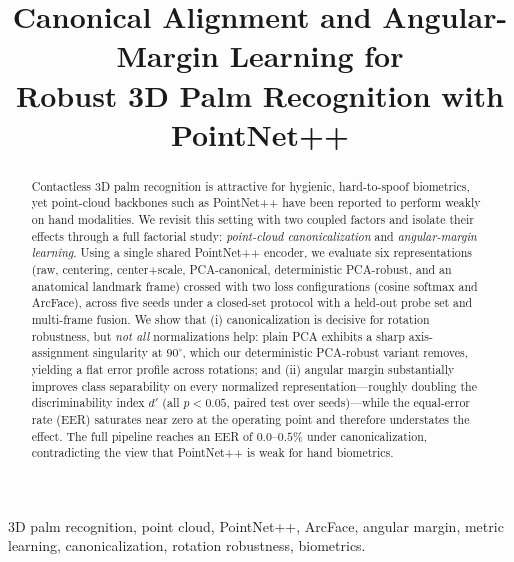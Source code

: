\documentclass[conference]{IEEEtran}
\begin{document}
\title{Canonical Alignment and Angular-Margin Learning for\\
Robust 3D Palm Recognition with PointNet++}

\author{
}

\maketitle

\begin{abstract}
Contactless 3D palm recognition is attractive for hygienic, hard-to-spoof
biometrics, yet point-cloud backbones such as PointNet++ have been reported to
perform weakly on hand modalities. We revisit this setting with two coupled
factors and isolate their effects through a full factorial study:
\emph{point-cloud canonicalization} and \emph{angular-margin learning}. Using a
single shared PointNet++ encoder, we evaluate six representations
(raw, centering, center+scale, PCA-canonical, deterministic PCA-robust, and an
anatomical landmark frame) crossed with two loss configurations (cosine softmax
and ArcFace), across five seeds under a closed-set protocol with a held-out probe
set and multi-frame fusion. We show that (i) canonicalization is decisive for
rotation robustness, but \emph{not all} normalizations help: plain PCA exhibits a
sharp axis-assignment singularity at $90^{\circ}$, which our deterministic
PCA-robust variant removes, yielding a flat error profile across rotations; and
(ii) angular margin substantially improves class separability on every
normalized representation---roughly doubling the discriminability index
$d'$ (all $p<0.05$, paired test over seeds)---while the equal-error rate (EER)
saturates near zero at the operating point and therefore understates the effect.
The full pipeline reaches an EER of $0.0$--$0.5\%$ under canonicalization,
contradicting the view that PointNet++ is weak for hand biometrics.
\end{abstract}

\begin{IEEEkeywords}
3D palm recognition, point cloud, PointNet++, ArcFace, angular margin, metric
learning, canonicalization, rotation robustness, biometrics.
\end{IEEEkeywords}

\end{document}

